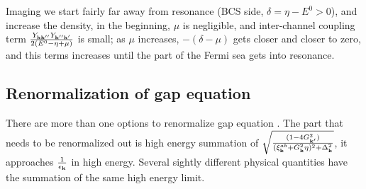 Imaging we start fairly far away from resonance (BCS side, $\delta=\eta-E^{0}>0$), and increase the density, in the beginning, $\mu$ is negligible, and inter-channel coupling term $\frac{Y_{\mathbf{k}\mathbf{k}''}Y_{\mathbf{k}''\mathbf{k}'}}{2(E^{0}-\eta+\mu)} $ is small; as $\mu$  increases, $-(\delta-\mu)$ gets closer and closer to zero, and this terms increases until the part of the Fermi sea gets into resonance.  





\subsection{Renormalization of gap equation}
There are more than one options to renormalize gap equation .  The part that needs to be renormalized out is  high energy summation of $\sqrt{\frac{(1-4G_{\mathbf{k}'}^{2})}{{(\xi^{ab}_{\mathbf{k}}+  G_{\mathbf{k}}^2\eta)^{2}+\Delta_{\mathbf{k}}^{2}}}}$, it approaches $\frac{1}{\epsilon_{\mathbf{k}}}$ in high energy.  Several sightly different physical quantities have the summation of the same high energy limit.  
